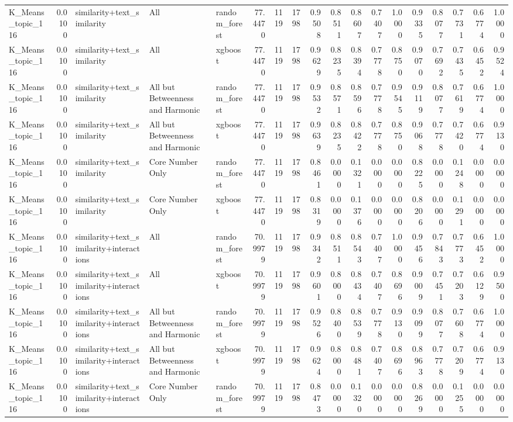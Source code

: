 \begin{tabular}{lrlllrrrrrrrrrrrrr}
K_Means_topic_116 & 0.0100 & similarity+text_similarity & All & random_forest & 77.4470 & 1119 & 1798 & 0.9508 & 0.8511 & 0.8607 & 0.7407 & 1.0000 & 0.9335 & 0.8077 & 0.7731 & 0.6774 & 1.0000 \\
K_Means_topic_116 & 0.0100 & similarity+text_similarity & All & xgboost & 77.4470 & 1119 & 1798 & 0.9629 & 0.8235 & 0.8394 & 0.7778 & 0.8750 & 0.9070 & 0.7692 & 0.7435 & 0.6452 & 0.9524 \\
K_Means_topic_116 & 0.0100 & similarity+text_similarity & All but Betweenness and Harmonic & random_forest & 77.4470 & 1119 & 1798 & 0.9532 & 0.8571 & 0.8596 & 0.7778 & 0.9545 & 0.9119 & 0.8077 & 0.7619 & 0.6774 & 1.0000 \\
K_Means_topic_116 & 0.0100 & similarity+text_similarity & All but Betweenness and Harmonic & xgboost & 77.4470 & 1119 & 1798 & 0.9639 & 0.8235 & 0.8422 & 0.7778 & 0.8750 & 0.9068 & 0.7778 & 0.7420 & 0.6774 & 0.9130 \\
K_Means_topic_116 & 0.0100 & similarity+text_similarity & Core Number Only & random_forest & 77.4470 & 1119 & 1798 & 0.8461 & 0.0000 & 0.1321 & 0.0000 & 0.0000 & 0.8225 & 0.0000 & 0.1248 & 0.0000 & 0.0000 \\
K_Means_topic_116 & 0.0100 & similarity+text_similarity & Core Number Only & xgboost & 77.4470 & 1119 & 1798 & 0.8319 & 0.0000 & 0.1376 & 0.0000 & 0.0000 & 0.8206 & 0.0000 & 0.1291 & 0.0000 & 0.0000 \\
K_Means_topic_116 & 0.0100 & similarity+text_similarity+interactions & All & random_forest & 70.9979 & 1119 & 1798 & 0.9342 & 0.8511 & 0.8543 & 0.7407 & 1.0000 & 0.9456 & 0.7843 & 0.7773 & 0.6452 & 1.0000 \\
K_Means_topic_116 & 0.0100 & similarity+text_similarity+interactions & All & xgboost & 70.9979 & 1119 & 1798 & 0.9601 & 0.8000 & 0.8434 & 0.7407 & 0.8696 & 0.9009 & 0.7451 & 0.7203 & 0.6129 & 0.9500 \\
K_Means_topic_116 & 0.0100 & similarity+text_similarity+interactions & All but Betweenness and Harmonic & random_forest & 70.9979 & 1119 & 1798 & 0.9526 & 0.8400 & 0.8539 & 0.7778 & 0.9130 & 0.9099 & 0.8077 & 0.7608 & 0.6774 & 1.0000 \\
K_Means_topic_116 & 0.0100 & similarity+text_similarity+interactions & All but Betweenness and Harmonic & xgboost & 70.9979 & 1119 & 1798 & 0.9624 & 0.8000 & 0.8481 & 0.7407 & 0.8696 & 0.8963 & 0.7778 & 0.7209 & 0.6774 & 0.9130 \\
K_Means_topic_116 & 0.0100 & similarity+text_similarity+interactions & Core Number Only & random_forest & 70.9979 & 1119 & 1798 & 0.8473 & 0.0000 & 0.1320 & 0.0000 & 0.0000 & 0.8269 & 0.0000 & 0.1255 & 0.0000 & 0.0000 \\

\end{tabular}
